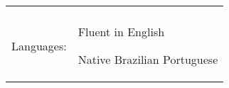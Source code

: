 \documentclass[a4paper,11pt]{article}
\begin{document}
\begin{tabular}{rp{15.2cm}}
\begin{itemize*}[label=\textbullet]
\end{itemize*}\\
\raggedleft Languages:
& \begin{itemize*}[label=\textbullet]
    \item Fluent in English
    \item Native Brazilian Portuguese
\end{itemize*}\\
\end{tabular}
\end{document}
